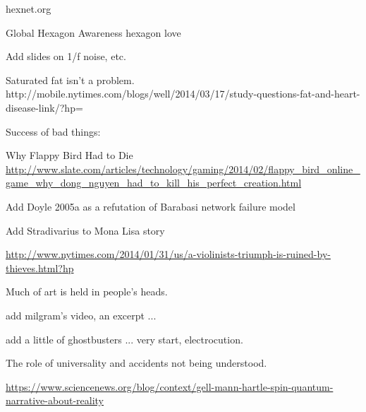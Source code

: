 \begin{frame}
  hexnet.org

  Global Hexagon Awareness
  hexagon love

\end{frame}

\begin{frame}
  Add slides on 1/f noise, etc.
\end{frame}

\begin{frame}
  Saturated fat isn't a problem.
http://mobile.nytimes.com/blogs/well/2014/03/17/study-questions-fat-and-heart-disease-link/?hp=
\end{frame}

\begin{frame}
  
  Success of bad things:

  Why Flappy Bird Had to Die
  \url{http://www.slate.com/articles/technology/gaming/2014/02/flappy_bird_online_game_why_dong_nguyen_had_to_kill_his_perfect_creation.html}

\end{frame}

\begin{frame}
  Add Doyle 2005a
  as a refutation of 
  Barabasi network failure model
  
\end{frame}

\begin{frame}
  Add Stradivarius to Mona Lisa story

\url{http://www.nytimes.com/2014/01/31/us/a-violinists-triumph-is-ruined-by-thieves.html?hp}

  Much of art is held in people's heads.
\end{frame}

\begin{frame}

add milgram's video, an excerpt ...

add a little of ghostbusters ...
very start, electrocution.
  
\end{frame}

\begin{frame}

  The role of universality and accidents not being understood.
  
  \url{https://www.sciencenews.org/blog/context/gell-mann-hartle-spin-quantum-narrative-about-reality}

\end{frame}

